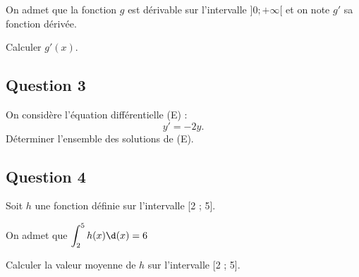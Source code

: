 On admet que la fonction $g$ est dérivable sur l'intervalle $]0 ; +\infty[$ et on note $g'$ sa
fonction dérivée.

Calculer $g'(x)$.


\subsection*{Question 3}
On considère l'équation différentielle (E) :
\[  y'=-2 y.   \]
Déterminer l'ensemble des solutions de (E).


\subsection*{Question 4}


Soit $h$ une fonction définie sur l'intervalle [2 ; 5].

On admet que $\displaystyle \int_{2}^{5} h(x) \d(x)=6$


Calculer la valeur moyenne de $h$ sur l'intervalle [2 ; 5].

